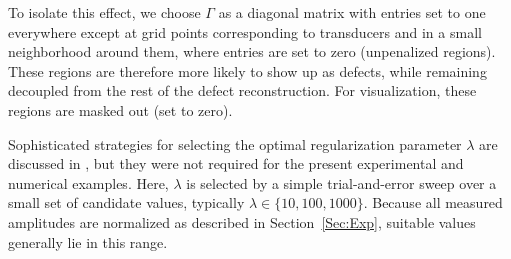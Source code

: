 \documentclass[a4paper,fleqn]{cas-sc}
\begin{document}
To isolate this effect, we choose $\Gamma$ as a diagonal matrix with entries set to one everywhere except at grid points corresponding to transducers and in a small neighborhood around them, where entries are set to zero (unpenalized regions). These regions are therefore more likely to show up as defects, while remaining decoupled from the rest of the defect reconstruction. For visualization, these regions are masked out (set to zero).

Sophisticated strategies for selecting the optimal regularization parameter $\lambda$ are discussed in \cite{Regularization_lambda_parameter_finding}, but they were not required for the present experimental and numerical examples. Here, $\lambda$ is selected by a simple trial-and-error sweep over a small set of candidate values, typically $\lambda \in \{10, 100, 1000\}$. Because all measured amplitudes are normalized as described in Section~\ref{Sec:Exp}, suitable values generally lie in this range.
\end{document}
